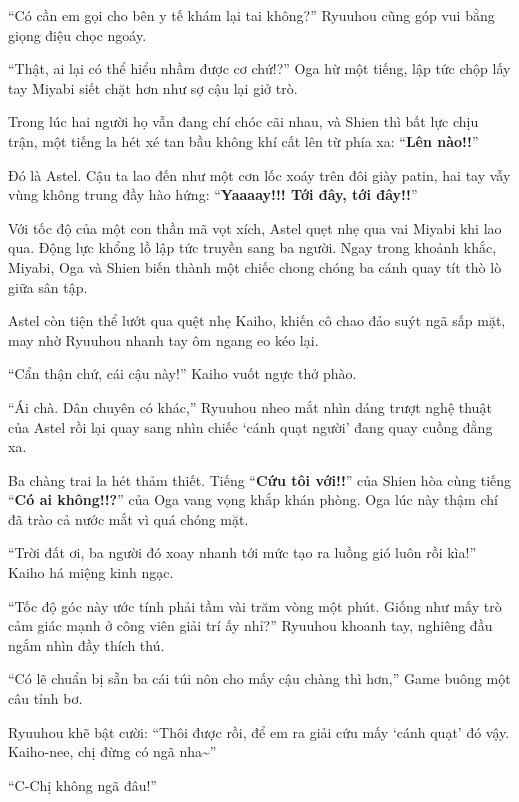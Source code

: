 \documentclass[../main.tex]{subfiles}
\begin{document}
``Có cần em gọi cho bên y tế khám lại tai không?'' Ryuuhou cũng góp vui bằng giọng điệu chọc ngoáy.

``Thật, ai lại có thể hiểu nhầm được cơ chứ!?'' Oga hừ một tiếng, lập tức chộp lấy tay Miyabi siết chặt hơn như sợ cậu lại giở trò.

Trong lúc hai người họ vẫn đang chí chóc cãi nhau, và Shien thì bất lực chịu trận, một tiếng la hét xé tan bầu không khí cất lên từ phía xa: ``\textbf{Lên nào!!}''

Đó là Astel. Cậu ta lao đến như một cơn lốc xoáy trên đôi giày patin, hai tay vẫy vùng không trung đầy hào hứng: ``\textbf{Yaaaay!!! Tới đây, tới đây!!}''


Với tốc độ của một con thần mã vọt xích, Astel quẹt nhẹ qua vai Miyabi khi lao qua. Động lực khổng lồ lập tức truyền sang ba người. Ngay trong khoảnh khắc, Miyabi, Oga và Shien biến thành một chiếc chong chóng ba cánh quay tít thò lò giữa sân tập.


Astel còn tiện thể lướt qua quệt nhẹ Kaiho, khiến cô chao đảo suýt ngã sấp mặt, may nhờ Ryuuhou nhanh tay ôm ngang eo kéo lại.

``Cẩn thận chứ, cái cậu này!'' Kaiho vuốt ngực thở phào.

``Ái chà. Dân chuyên có khác,'' Ryuuhou nheo mắt nhìn dáng trượt nghệ thuật của Astel rồi lại quay sang nhìn chiếc `cánh quạt người' đang quay cuồng đằng xa.

Ba chàng trai la hét thảm thiết. Tiếng ``\textbf{Cứu tôi với!!}'' của Shien hòa cùng tiếng ``\textbf{Có ai không!!?}'' của Oga vang vọng khắp khán phòng. Oga lúc này thậm chí đã trào cả nước mắt vì quá chóng mặt.


``Trời đất ơi, ba người đó xoay nhanh tới mức tạo ra luồng gió luôn rồi kìa!'' Kaiho há miệng kinh ngạc.

``Tốc độ góc này ước tính phải tầm vài trăm vòng một phút. Giống như mấy trò cảm giác mạnh ở công viên giải trí ấy nhỉ?'' Ryuuhou khoanh tay, nghiêng đầu ngắm nhìn đầy thích thú.

``Có lẽ chuẩn bị sẵn ba cái túi nôn cho mấy cậu chàng thì hơn,'' Game buông một câu tỉnh bơ.

Ryuuhou khẽ bật cười: ``Thôi được rồi, để em ra giải cứu mấy `cánh quạt' đó vậy. Kaiho-nee, chị đừng có ngã nha\~{}''

``C-Chị không ngã đâu!''
\end{document}
